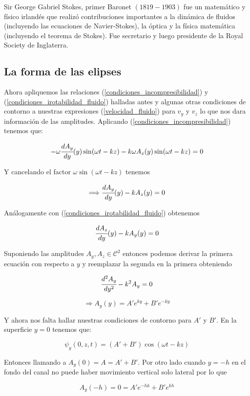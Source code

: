 \documentclass[a4paper,spanish]{article}
\numberwithin{equation}{section}
\begin{document}
Sir George Gabriel Stokes, primer Baronet $(1819-1903)$ fue un matem\'atico y f\'isico irland\'es que realiz\'o contribuciones importantes a la din\'amica de fluidos (incluyendo las ecuaciones de Navier-Stokes), la \'optica y la f\'isica matem\'atica (incluyendo el teorema de Stokes). Fue secretario y luego presidente de la Royal Society de Inglaterra.

\subsection{La forma de las elipses}
Ahora apliquemos las relaciones (\ref{condiciones_incompresibilidad}) y (\ref{condiciones_irotabilidad_fluido}) halladas antes y algunas otras condiciones de contorno a nuestras expresiones (\ref{velocidad_fluido}) para $v_y$ y $v_z$ lo que nos dara informaci\'on de las amplitudes. Aplicando (\ref{condiciones_incompresibilidad}) tenemos que:

\[ -\omega \cfrac{d {A_y}}{dy}(y)\sin(\omega t -kz) - k \omega A_z(y)\sin(\omega t -kz) =0
\]

Y cancelando el factor $\omega \sin( \omega t -kz)$ tenemos

\begin{equation}
 \Longrightarrow \cfrac{d {A_y}}{dy}(y) -k A_z(y) =0 
\end{equation}

An\'alogamente con (\ref{condiciones_irotabilidad_fluido}) obtenemos

\begin{equation}
 \cfrac{d {A_z}}{dy}(y) -k A_y(y) =0 
\end{equation}

Suponiendo las amplitudes $A_y,A_z \in \mathcal{C}^2$ entonces podemos derivar la primera ecuaci\'on con respecto a $y$ y reemplazar la segunda en la primera obteniendo

\[\cfrac{d^2A_y}{dy^2}-k^2A_y=0\]

\[\Longrightarrow A_y(y)=A'e^{ky}+B'e^{-ky}\]

Y ahora nos falta hallar nuestras condiciones de contorno para $A'$ y $B'$. En la superficie $y=0$ tenemos que:

\[\psi_y(0,z,t)=\left(A'+B'\right)\cos(\omega t -kz)\] 

Entonces llamando a $A_y(0)=A=A'+B'$. Por otro lado cuando $y=-h$ en el fondo del canal no puede haber movimiento vertical solo lateral por lo que 

\[A_y(-h)=0=A'e^{-hk}+B'e^{kh}\]
\end{document}
